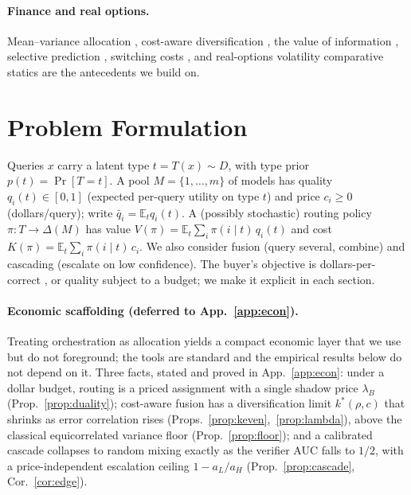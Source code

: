 \documentclass[11pt]{article}
\theoremstyle{plain}
\theoremstyle{definition}
\newcommand{\E}{\mathbb{E}}
\begin{document}
\paragraph{Finance and real options.} Mean--variance allocation \citep{markowitz1952}, cost-aware diversification
\citep{statman1987}, the value of information \citep{howard1966}, selective prediction \citep{geifman2017}, switching
costs \citep{klemperer1995}, and real-options volatility comparative statics \citep{mcdonald1986,dixit1994,merton1976}
are the antecedents we build on.

\section{Problem Formulation}\label{sec:setup-formal}
Queries $x$ carry a latent type $t=T(x)\sim D$, with type prior $p(t)=\Pr[T=t]$. A pool $M=\{1,\dots,m\}$ of models has
quality $q_i(t)\in[0,1]$ (expected per-query utility on type $t$) and price $c_i\ge 0$ (dollars/query); write
$\bar q_i=\E_t q_i(t)$. A (possibly stochastic) routing policy $\pi\colon T\to\Delta(M)$ has value
$V(\pi)=\E_t\sum_i \pi(i\mid t)\,q_i(t)$ and cost $K(\pi)=\E_t\sum_i \pi(i\mid t)\,c_i$. We also consider fusion (query
several, combine) and cascading (escalate on low confidence). The buyer's objective is dollars-per-correct
\citep{erol2025costofpass}, or quality subject to a budget; we make it explicit in each section.

\paragraph{Economic scaffolding (deferred to App.~\ref{app:econ}).} Treating orchestration as allocation yields a
compact economic layer that we use but do not foreground; the tools are standard and the empirical results below do
not depend on it. Three facts, stated and proved in App.~\ref{app:econ}: under a dollar budget, routing is a priced
assignment with a single shadow price $\lambda_B$ (Prop.~\ref{prop:duality}); cost-aware fusion has a diversification
limit $k^\ast(\rho,c)$ that shrinks as error correlation rises (Props.~\ref{prop:keven},~\ref{prop:lambda}), above the
classical equicorrelated variance floor (Prop.~\ref{prop:floor}); and a calibrated cascade collapses to
random mixing exactly as the verifier AUC falls to $1/2$, with a price-independent escalation ceiling $1-a_L/a_H$
(Prop.~\ref{prop:cascade}, Cor.~\ref{cor:edge}).
\end{document}

